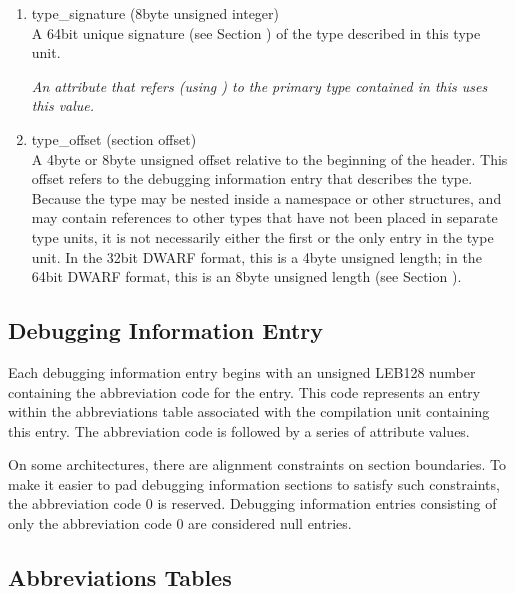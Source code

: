\begin{enumerate}[1. ]
\item type\_signature (8\dash byte unsigned integer) \\
A 
64\dash bit unique signature (see Section 
)
of the type described in this type
unit.  

\textit{An attribute that refers (using 
) to
the primary type contained in this 
 uses this value.}


\item type\_offset (section offset) \\
A 4\dash byte or 8\dash byte unsigned offset 
relative to the beginning
of the  header.
This offset refers to the debugging
information entry that describes the type. Because the type
may be nested inside a namespace or other structures, and may
contain references to other types that have not been placed in
separate type units, it is not necessarily either the first or
the only entry in the type unit. In the 32\dash bit DWARF format,
this is a 4\dash byte unsigned length; in the 64\dash bit DWARF format,
this is an 8\dash byte unsigned length
(see Section ).

\end{enumerate}

\subsection{Debugging Information Entry}
\label{datarep:debugginginformationentry}

Each debugging information entry begins with an unsigned LEB128
number containing the abbreviation code for the entry. This
code represents an entry within the abbreviations table
associated with the compilation unit containing this entry. The
abbreviation code is followed by a series of attribute values.

On some architectures, there are alignment constraints on
section boundaries. To make it easier to pad debugging
information sections to satisfy such constraints, the
abbreviation code 0 is reserved. Debugging information entries
consisting of only the abbreviation code 0 are considered
null entries.

\subsection{Abbreviations Tables}
\label{datarep:abbreviationstables}


